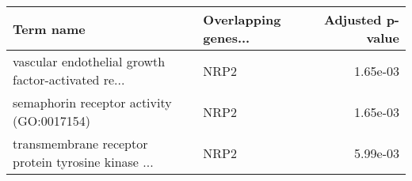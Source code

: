 \begin{tabular}{llr}
\toprule
                                         Term name & Overlapping genes... &  Adjusted p-value \\
\midrule
vascular endothelial growth factor-activated re... &                 NRP2 &          1.65e-03 \\
         semaphorin receptor activity (GO:0017154) &                 NRP2 &          1.65e-03 \\
transmembrane receptor protein tyrosine kinase ... &                 NRP2 &          5.99e-03 \\
\bottomrule
\end{tabular}
